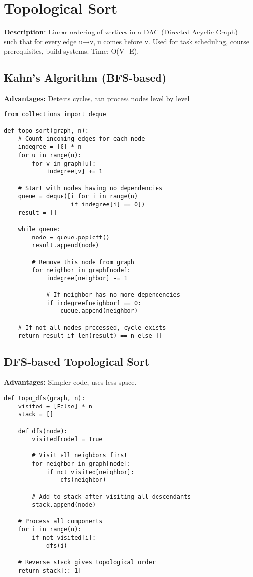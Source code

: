 \section{Topological Sort}

\textbf{Description:} Linear ordering of vertices in a DAG (Directed Acyclic Graph) such that for every edge u→v, u comes before v. Used for task scheduling, course prerequisites, build systems. Time: O(V+E).

\subsection{Kahn's Algorithm (BFS-based)}
\textbf{Advantages:} Detects cycles, can process nodes level by level.

\begin{lstlisting}
from collections import deque

def topo_sort(graph, n):
    # Count incoming edges for each node
    indegree = [0] * n
    for u in range(n):
        for v in graph[u]:
            indegree[v] += 1
    
    # Start with nodes having no dependencies
    queue = deque([i for i in range(n) 
                   if indegree[i] == 0])
    result = []
    
    while queue:
        node = queue.popleft()
        result.append(node)
        
        # Remove this node from graph
        for neighbor in graph[node]:
            indegree[neighbor] -= 1
            
            # If neighbor has no more dependencies
            if indegree[neighbor] == 0:
                queue.append(neighbor)
    
    # If not all nodes processed, cycle exists
    return result if len(result) == n else []
\end{lstlisting}

\subsection{DFS-based Topological Sort}
\textbf{Advantages:} Simpler code, uses less space.

\begin{lstlisting}
def topo_dfs(graph, n):
    visited = [False] * n
    stack = []
    
    def dfs(node):
        visited[node] = True
        
        # Visit all neighbors first
        for neighbor in graph[node]:
            if not visited[neighbor]:
                dfs(neighbor)
        
        # Add to stack after visiting all descendants
        stack.append(node)
    
    # Process all components
    for i in range(n):
        if not visited[i]:
            dfs(i)
    
    # Reverse stack gives topological order
    return stack[::-1]
\end{lstlisting}

